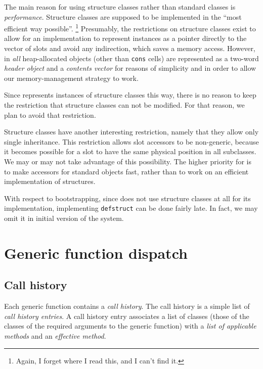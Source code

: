 The main reason for using structure classes rather than standard
classes is \emph{performance}.  Structure classes are supposed to be
implemented in the ``most efficient way possible''.%
\footnote{Again, I forget where I read this, and I can't find it.}
Presumably, the restrictions on structure classes exist to allow for
an implementation to represent instances as a pointer directly to the
vector of slots and avoid any indirection, which saves a memory
access.  However, in \sysname{} \emph{all} heap-allocated objects
(other than \texttt{cons} cells) are represented as a two-word
\emph{header object} and a \emph{contents vector} for reasons of
simplicity and in order to allow our memory-management strategy to
work.

Since \sysname{} represents instances of structure classes this way,
there is no reason to keep the restriction that structure classes can
not be modified.  For that reason, we plan to avoid that restriction.

Structure classes have another interesting restriction, namely that
they allow only single inheritance.  This restriction allows slot
accessors to be non-generic, because it becomes possible for a slot to
have the same physical position in all subclasses.  We may or may not
take advantage of this possibility.  The higher priority for
\sysname{} is to make accessors for standard objects fast, rather than
to work on an efficient implementation of structures. 

With respect to bootstrapping, since \sysname{} does not use structure
classes at all for its implementation, implementing \texttt{defstruct}
can be done fairly late.  In fact, we may omit it in initial version
of the system. 

\section{Generic function dispatch}
\label{sec-generic-function-dispatch}

\subsection{Call history}
\label{sec-generic-function-dispatch-call-history}

Each generic function contains a \emph{call history}.  The call
history is a simple list of \emph{call history entries}.  A call
history entry associates a list of classes (those of the classes of
the required arguments to the generic function) with a \emph{list of
  applicable methods} and an \emph{effective method}.

